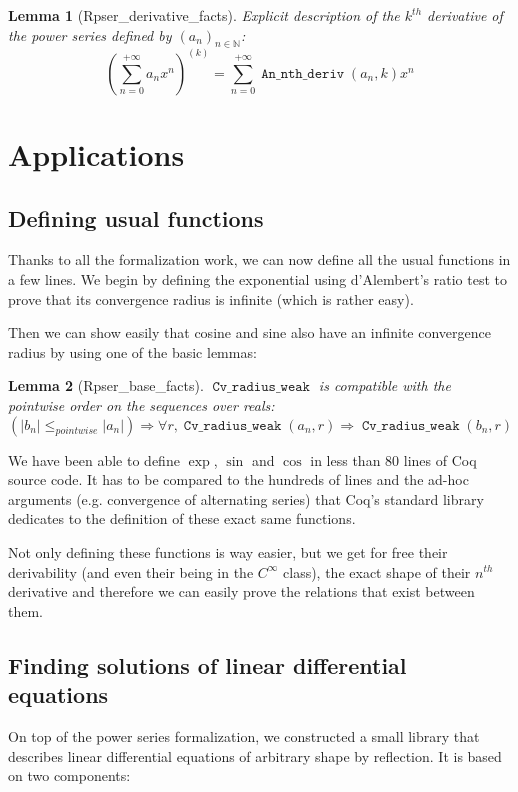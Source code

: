 \documentclass[submission,copyright]{eptcs}
\newcommand{\coq}{Coq}
\newcommand{\N}{\mathbb{N}}
\DeclareMathOperator{\Dn}{\mathtt{An\_nth\_deriv}}
\DeclareMathOperator{\cvrw}{\mathtt{Cv\_radius\_weak}}
\newtheorem{lemma}{Lemma}
\begin{document}
\begin{lemma}[Rpser\_derivative\_facts] Explicit description of
the $k^{th}$ derivative of the power series defined by $(a_n)_{n\in \N}$:
$$\left(\sum_{n=0}^{+\infty} a_n x^n\right)^{(k)} = \sum_{n=0}^{+\infty}
\Dn{}(a_n,k) x^n$$\end{lemma}

\section{Applications}

\subsection{Defining usual functions}

Thanks to all the formalization work, we can now define all the usual
functions in a few lines. We begin by defining the exponential using
d'Alembert's ratio test to prove that its convergence radius is infinite
(which is rather easy).

Then we can show easily that cosine and sine also have an infinite
convergence radius by using one of the basic lemmas:

\begin{lemma}[Rpser\_base\_facts] $\cvrw{}$ is compatible with the
pointwise order on the sequences over reals:
$$\left(\left|b_n\right| \le_{pointwise} \left|a_n\right|\right)
  \Rightarrow \forall r, \cvrw{}(a_n,r) \Rightarrow \cvrw{}(b_n,r)$$
\end{lemma}

We have been able to define $\exp$, $\sin$ and $\cos$ in less than 80
lines of \coq{} source code. It has to be compared to the hundreds
of lines and the ad-hoc arguments (e.g. convergence of alternating series)
that \coq{}'s standard library dedicates to the definition of these exact
same functions.

Not only defining these functions is way easier, but we get for
free their derivability (and even their being in the $C^{\infty}$ class),
the exact shape of their $n^{th}$ derivative and therefore we can easily
prove the relations that exist between them.

\subsection{Finding solutions of linear differential equations}

On top of the power series formalization, we constructed a small library
that describes linear differential equations of arbitrary shape by
reflection. It is based on two components:
\end{document}
